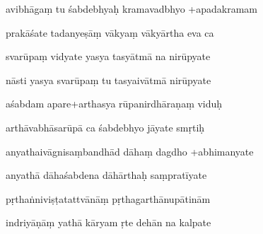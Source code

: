 \documentclass[article,12pt,a4paper]{memoir}%
\newcounter{parCount}
\begin{document}
	  
	  \pstart {} avibhāgaṃ tu śabdebhyaḥ kramavadbhyo +apadakramam 
	{}
	\pend%
      

	  
	  \pstart \leavevmode%
	prakāśate tadanyeṣāṃ vākyaṃ vākyārtha eva ca 
	{}
	\pend%
      

	  
	  \pstart {} svarūpaṃ vidyate yasya tasyātmā na nirūpyate 
	{}
	\pend%
      

	  
	  \pstart \leavevmode%
	nāsti yasya svarūpaṃ tu tasyaivātmā nirūpyate 
	{}
	\pend%
      

	  
	  \pstart {} aśabdam apare+arthasya rūpanirdhāraṇaṃ viduḥ 
	{}
	\pend%
      

	  
	  \pstart \leavevmode%
	arthāvabhāsarūpā ca śabdebhyo jāyate smṛtiḥ 
	{}
	\pend%
      

	  
	  \pstart {} anyathaivāgnisaṃbandhād dāhaṃ dagdho +abhimanyate 
	{}
	\pend%
      

	  
	  \pstart \leavevmode%
	anyathā dāhaśabdena dāhārthaḥ saṃpratīyate 
	{}
	\pend%
      

	  
	  \pstart {} pṛthaṅniviṣṭatattvānāṃ pṛthagarthānupātinām 
	{}
	\pend%
      

	  
	  \pstart \leavevmode%
	indriyāṇāṃ yathā kāryam ṛte dehān na kalpate 
	{}
	\pend%
      
\end{document}
